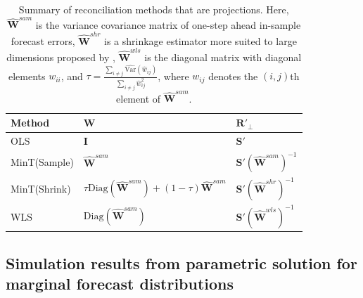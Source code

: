 \documentclass[12pt]{article}
\def\var{\text{Var}}
\theoremstyle{definition}
\begin{document}
\begin{table}[!h]
	\caption{Summary of reconciliation methods that are projections. Here, $\hat{\bm{W}}^{sam}$ is the variance covariance matrix of one-step ahead in-sample forecast errors, $\hat{\bm{W}}^{shr}$ is a shrinkage estimator more suited to large dimensions proposed by \citet{Schafer2005}, $\hat{\bm{W}}^{wls}$ is the diagonal matrix with diagonal elements $w_{ii}$, and $\tau = \frac{\sum_{i \neq j}\hat{\var}(\hat{w}_{ij})}{\sum_{i \neq j}{\hat{w}}^2_{ij}}$, where $w_{ij}$ denotes the $(i,j)$th element of $\hat{\bm{W}}^{sam}$.}\label{table:ReconMethods}
	\centering
	\begin{tabular}{lll}
		\toprule
		\textbf{Method} & \textbf{$\bm{W}$} & \textbf{ $\bm{R}'_\bot$}      \\
		\midrule
		OLS             &
		$\bm{I}$  &
		$\bm{S}'$  \\
		MinT(Sample)    &
		$\hat{\bm{W}}^{sam}$ &
		$\bm{S}'(\hat{\bm{W}}^{sam})^{-1}$ \\
		MinT(Shrink)    &
		$\tau\text{Diag}(\hat{\bm{W}}^{sam}) + (1-\tau)\hat{\bm{W}}^{sam}$ &
		$\bm{S}'(\hat{\bm{W}}^{shr})^{-1}$ \\
		WLS       &
		$\text{Diag}(\hat{\bm{W}}^{sam})$ &
		$\bm{S}'(\hat{\bm{W}}^{wls})^{-1}$ \\
		\bottomrule
	\end{tabular}
\end{table}

\subsection{Simulation results from parametric solution for marginal forecast distributions}\label{Append:Gauss_sim_Univ}
\end{document}
